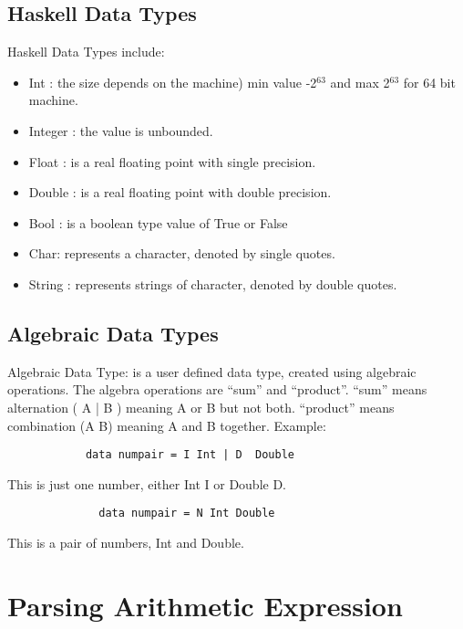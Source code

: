 \documentclass{article}
\begin{document}
\subsection{Haskell Data Types}
Haskell Data Types include:
\begin{itemize}
  \item Int : the size depends on the machine) min value -2$^63$ and max 2$^63$ for 64 bit machine. 
  \item Integer : the value is unbounded.
  \item Float : is a real floating point with single precision.
  \item Double : is a real floating point with double precision.
  \item Bool : is a boolean type value of True or False
  \item Char: represents a character, denoted by  single quotes.
  \item String : represents strings of character, denoted by double quotes.
\end{itemize}
\subsection{Algebraic Data Types}
Algebraic Data Type: is a user defined data type, created using algebraic operations. The algebra operations are “sum” and “product”.
“sum” means alternation ( A | B ) meaning A or B but not both.
“product” means combination (A B) meaning A and B together.
\newline Example:
\begin{lstlisting}
            data numpair = I Int | D  Double
\end{lstlisting}
             This is just one number, either Int I or Double D.
\begin{lstlisting}
              data numpair = N Int Double
\end{lstlisting}
              This is a pair of numbers, Int and Double.
              
\section{Parsing Arithmetic Expression}              
\end{document}
